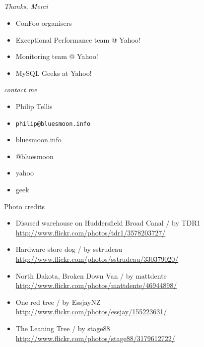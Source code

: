 \documentclass{beamer}
\begin{document}
\subsection{}
\begin{frame}{\textit{Thanks, Merci}}
  \begin{itemize}
  \item ConFoo organisers
  \item Exceptional Performance team @ Yahoo!
  \item Monitoring team @ Yahoo!
  \item MySQL Geeks at Yahoo!
  \end{itemize}
\end{frame}

\begin{frame}{\textit{contact me}}
  \begin{itemize}
  \item Philip Tellis
  \item \small{\texttt{philip@bluesmoon.info}}
  \item \href{http://bluesmoon.info/}{bluesmoon.info}
  \item @bluesmoon
  \item yahoo
  \item geek
  \end{itemize}
\end{frame}

\begin{frame}{Photo credits}
  \small{
  \begin{itemize}
  \item Disused warehouse on Huddersfield Broad Canal / by TDR1 \\ \href{http://www.flickr.com/photos/tdr1/3578203727/}{http://www.flickr.com/photos/tdr1/3578203727/}
  \item Hardware store dog / by sstrudeau \\ \href{http://www.flickr.com/photos/sstrudeau/330379020/}{http://www.flickr.com/photos/sstrudeau/330379020/}
  \item North Dakota, Broken Down Van / by mattdente \\ \href{http://www.flickr.com/photos/mattdente/46944898/}{http://www.flickr.com/photos/mattdente/46944898/}
  \item One red tree / by EssjayNZ \\ \href{http://www.flickr.com/photos/essjay/155223631/}{http://www.flickr.com/photos/essjay/155223631/}
  \item The Leaning Tree / by stage88 \\ \href{http://www.flickr.com/photos/stage88/3179612722/}{http://www.flickr.com/photos/stage88/3179612722/}
  \end{itemize}
  }
\end{frame}
\end{document}
